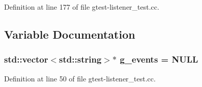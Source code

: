 Definition at line 177 of file gtest-\/listener\+\_\+test.\+cc.



\subsection{Variable Documentation}
\subsubsection[{\texorpdfstring{g\+\_\+events}{g_events}}]{\setlength{\rightskip}{0pt plus 5cm}std\+::vector$<$std\+::string$>$$\ast$ g\+\_\+events = N\+U\+LL}\hypertarget{gtest-listener__test_8cc_a32a264046f3603db11e6fcdaea5fb094}{}\label{gtest-listener__test_8cc_a32a264046f3603db11e6fcdaea5fb094}


Definition at line 50 of file gtest-\/listener\+\_\+test.\+cc.

